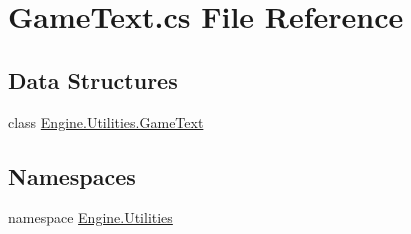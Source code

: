 \hypertarget{a00230}{}\section{Game\+Text.\+cs File Reference}
\label{a00230}
\subsection*{Data Structures}
\begin{DoxyCompactItemize}
\item 
class \hyperlink{a00598}{Engine.\+Utilities.\+Game\+Text}
\end{DoxyCompactItemize}
\subsection*{Namespaces}
\begin{DoxyCompactItemize}
\item 
namespace \hyperlink{a00281}{Engine.\+Utilities}
\end{DoxyCompactItemize}
